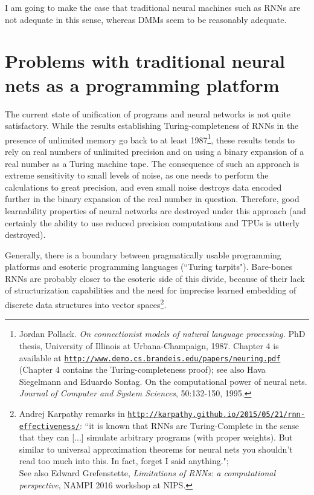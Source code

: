 \documentclass{article}
\begin{document}
I am going to make the case that traditional neural machines such as RNNs are not adequate in this sense,
whereas DMMs seem to be reasonably adequate.

\section{Problems with traditional neural nets as a programming platform}


The current state of unification of programs and neural networks is not quite satisfactory.
While the results establishing Turing-completeness of RNNs in the presence of unlimited memory go back to
at least 1987\footnote{Jordan Pollack. {\em On connectionist models of natural language processing.} PhD thesis, 
University of Illinois at Urbana-Champaign, 1987. Chapter 4 is available at
\href{http://www.demo.cs.brandeis.edu/papers/neuring.pdf}{\tt http://www.demo.cs.brandeis.edu/papers/neuring.pdf} (Chapter 4 contains the Turing-completeness proof);
see also Hava Siegelmann and Eduardo Sontag. On the computational power of neural nets. {\em Journal of Computer
and System Sciences}, 50:132-150, 1995.}, 
these results tends to rely on real numbers of unlimited precision and on
using a binary expansion of a real number as a Turing machine tape. The consequence of such an approach
is extreme sensitivity to small levels of noise, as one needs to perform the calculations to great precision, and even small noise
destroys data encoded further in the binary expansion of the real number in question.
Therefore, good learnability properties of neural networks are destroyed under this approach
(and certainly the ability to use reduced precision computations and TPUs is utterly destroyed).

Generally, there is a boundary between pragmatically usable programming platforms and
esoteric programming languages (``Turing tarpits"). Bare-bones RNNs are probably closer
to the esoteric side of this divide, because of their lack of structurization capabilities and the need for imprecise learned
embedding of discrete data structures into vector spaces\footnote{Andrej Karpathy remarks in 
\href{http://karpathy.github.io/2015/05/21/rnn-effectiveness/}{\tt http://karpathy.github.io/2015/05/21/rnn-effectiveness/}:
``it is known that RNNs are Turing-Complete
in the sense that they can [...] simulate arbitrary programs (with
proper weights). But similar to universal approximation theorems
for neural nets you shouldn't read too much into this. In fact,
forget I said anything.";\\ See also
Edward Grefenstette, {\em Limitations of RNNs: a computational
perspective}, NAMPI 2016 workshop at NIPS.}.
\end{document}
